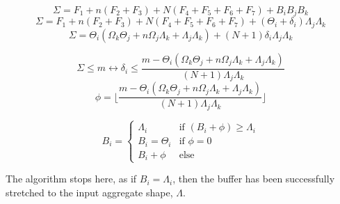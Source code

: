 \documentclass[conference]{IEEEtran}
\begin{document}
$$\Sigma = F_1 + n(F_2 + F_3) + N(F_4 + F_5 + F_6 + F_7) + B_iB_jB_k$$
$$\Sigma = F_1 + n(F_2 + F_3) + N(F_4 + F_5 + F_6 + F_7) + (\Theta_i + \delta_i)\Lambda_j\Lambda_k$$
$$\Sigma = \Theta_i(\Omega_k\Theta_j + n\Omega_j\Lambda_k + \Lambda_j\Lambda_k) + (N+1)\delta_i\Lambda_j\Lambda_k$$

$$\Sigma \leq m \leftrightarrow \delta_i \leq \frac{m-\Theta_i(\Omega_k\Theta_j + n\Omega_j\Lambda_k + \Lambda_j\Lambda_k)}{(N+1)\Lambda_j\Lambda_k}$$
$$\phi = \lfloor \frac{m-\Theta_i(\Omega_k\Theta_j + n\Omega_j\Lambda_k + \Lambda_j\Lambda_k)}{(N+1)\Lambda_j\Lambda_k} \rfloor$$

$$B_i = \begin{cases}
  \Lambda_i & \textrm{if }(B_i+\phi) \geq \Lambda_i \\
  B_i = \Theta_i & \textrm{if }\phi = 0 \\
  B_i+\phi & \textrm{else}
\end{cases}$$

The algorithm stops here, as if $B_i=\Lambda_i$, then the buffer has been
successfully stretched to the input aggregate shape, $\Lambda$.
\end{document}
